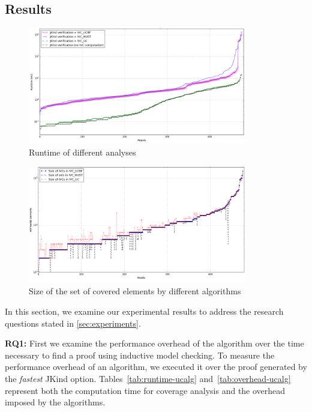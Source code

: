 \subsection{Results}
\label{sec:results}

\newcommand{\takeaway}[1]{
\vspace{6pt}
\noindent\fbox{\parbox{0.98\columnwidth}{#1}}
\vspace{6pt}
}

\begin{figure}
  \centering
  \includegraphics[width=0.85\textwidth]{figs/timing_analyses_all_sorted.png}
  \vspace{-0.1in}
  \caption{Runtime of different analyses}\label{fig:runtimeall}
\end{figure}

\begin{figure}
  \centering
  \includegraphics[width=0.85\textwidth]{figs/size.png}
  \vspace{-0.1in}
  \caption{Size of the set of covered elements by different algorithms}\label{fig:size}
\end{figure}

In this section, we examine our experimental results to address the research questions stated in \ref{sec:experiments}.

\textbf{RQ1:} First we examine the performance overhead of the \ucalg algorithm over the time necessary to find a proof using inductive model checking. To measure the performance overhead of an algorithm, we executed it over the proof generated by the {\em fastest} JKind option. Tables~\ref{tab:runtime-ucalg}
and~\ref{tab:overhead-ucalg} represent both the
computation time for coverage analysis
and the overhead imposed by the algorithms.

